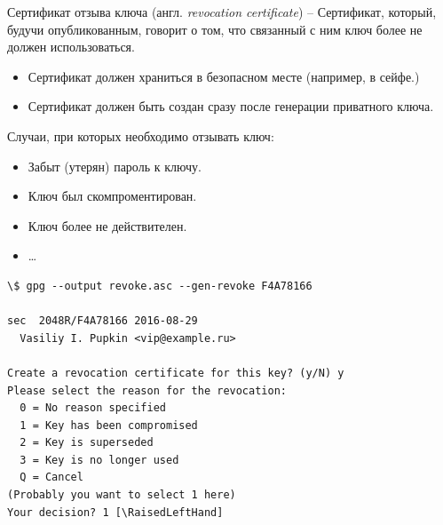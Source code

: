 \documentclass[presentation]{beamer}
\newcommand{\RaisedLeftHand}{%
  \raisebox{-.50em}{\Large\HandLeft}
}
\newcommand{\EndOfSectionOrnament}{
  \begin{center}
    \pgfornament[width=0.5\textwidth]{88}
    \end{center}
}
\begin{document}
\begin{frame}[fragile]{}
  \raisebox{-.30em}{\Large\HandRight}\hspace{.25em} Сертификат отзыва
  ключа (англ. \emph{revocation certificate}) -- Сертификат, который,
  будучи опубликованным, говорит о том, что связанный с ним ключ более
  не должен использоваться.\newline

  \begin{itemize}
  \item Сертификат должен храниться в безопасном месте (например, в
    сейфе.)
  \item Сертификат должен быть создан сразу после генерации приватного
    ключа.\newline
  \end{itemize}
  
  Случаи, при которых необходимо отзывать ключ:
  \begin{itemize}
  \item Забыт (утерян) пароль к ключу.
  \item Ключ был скомпроментирован.
  \item Ключ более не действителен.
  \item \ldots{}
  \end{itemize}
\end{frame}

\begin{frame}[fragile]{}
  \small
\begin{Verbatim}[commandchars=\\\[\]]
\$ gpg --output revoke.asc --gen-revoke F4A78166

sec  2048R/F4A78166 2016-08-29
  Vasiliy I. Pupkin <vip@example.ru>

Create a revocation certificate for this key? (y/N) y
Please select the reason for the revocation:
  0 = No reason specified
  1 = Key has been compromised
  2 = Key is superseded
  3 = Key is no longer used
  Q = Cancel
(Probably you want to select 1 here)
Your decision? 1 [\RaisedLeftHand]
\end{Verbatim}
\normalsize
\EndOfSectionOrnament
\end{frame}
\end{document}
